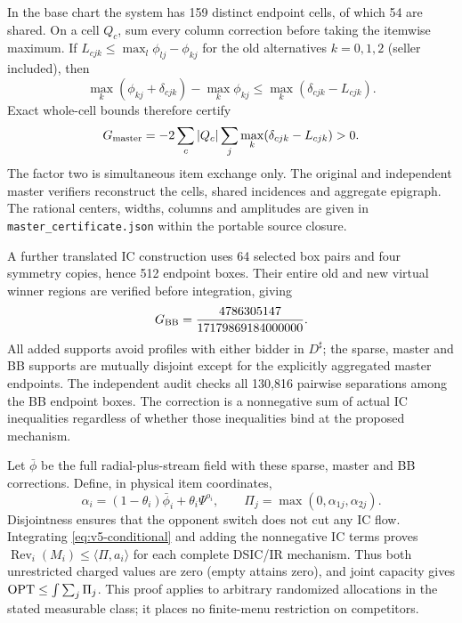 In the base chart the system has 159 distinct endpoint cells, of which 54 are shared.
On a cell $Q_c$, sum every column correction before taking the itemwise
maximum. If $L_{cjk}\le\max_l\phi_{lj}-\phi_{kj}$ for the old alternatives
$k=0,1,2$ (seller included), then
\[
 \max_k(\phi_{kj}+\delta_{cjk})-\max_k\phi_{kj}
       \le\max_k(\delta_{cjk}-L_{cjk}).
\]
Exact whole-cell bounds therefore certify
\[
 G_{\rm master}=-2\sum_c|Q_c|\sum_j
                   \max_k(\delta_{cjk}-L_{cjk})>0.
\]
The factor two is simultaneous item exchange only. The original and
independent master verifiers reconstruct the cells, shared incidences
and aggregate epigraph. The rational centers, widths, columns and
amplitudes are given in \texttt{master\_certificate.json}
within the portable source closure.

A further translated IC construction uses 64 selected box pairs and
four symmetry copies, hence 512 endpoint boxes. Their entire old and
new virtual winner regions are verified before integration, giving
\begin{equation}\label{eq:v5-BB-gain}
 G_{\rm BB}=\frac{4786305147}{17179869184000000}.
\end{equation}
All added supports avoid profiles with either bidder in $D^\sharp$;
the sparse, master and BB supports are mutually disjoint except for
the explicitly aggregated master endpoints. The independent audit
checks all 130,816 pairwise separations among the BB endpoint boxes.
The correction is a nonnegative sum of actual IC inequalities regardless
of whether those inequalities bind at the proposed mechanism.

Let $\bar\phi$ be the full radial-plus-stream field with these sparse,
master and BB corrections. Define, in physical item coordinates,
\begin{equation}\label{eq:v5-Pi}
 \alpha_i=(1-\theta_i)\bar\phi_i+\theta_i\Psi^{o_i},\qquad
 \Pi_j=\max(0,\alpha_{1j},\alpha_{2j}).
\end{equation}
Disjointness ensures that the opponent switch does not cut any IC flow.
Integrating \eqref{eq:v5-conditional} and adding the nonnegative IC
terms proves $\operatorname{Rev}_i(M_i)\le\langle\Pi,a_i\rangle$ for each complete
DSIC/IR mechanism. Thus both unrestricted charged values are zero
(empty attains zero), and joint capacity gives $\operatorname{OPT}\le\int\sum_j\Pi_j$.
This proof applies to arbitrary randomized allocations in the stated
measurable class; it places no finite-menu restriction on competitors.

